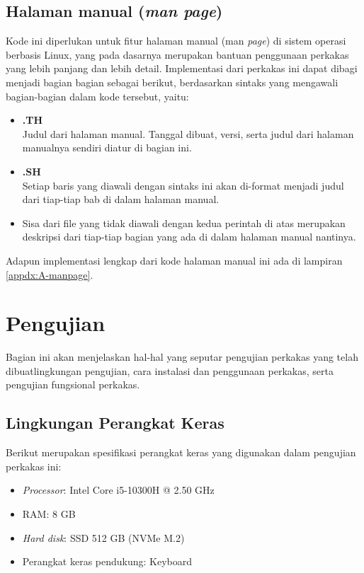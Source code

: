 \subsection{Halaman manual (\textit{man page})}
\label{sec:testing-implementation-man}

Kode ini diperlukan untuk fitur halaman manual (man \textit{page}) di sistem operasi berbasis Linux, yang pada dasarnya merupakan bantuan penggunaan perkakas yang lebih panjang dan lebih detail. Implementasi dari perkakas ini dapat dibagi menjadi bagian bagian sebagai berikut, berdasarkan sintaks yang mengawali bagian-bagian dalam kode tersebut, yaitu:

\begin{itemize}
	\item \textbf{.TH} \\
	Judul dari halaman manual. Tanggal dibuat, versi, serta judul dari halaman manualnya sendiri diatur di bagian ini.
	\item \textbf{.SH} \\
	Setiap baris yang diawali dengan sintaks ini akan di-format menjadi judul dari tiap-tiap bab di dalam halaman manual.
	\item Sisa dari file yang tidak diawali dengan kedua perintah di atas merupakan deskripsi dari tiap-tiap bagian yang ada di dalam halaman manual nantinya.
\end{itemize}
\noindent
Adapun implementasi lengkap dari kode halaman manual ini ada di lampiran \ref{appdx:A-manpage}.

\section{Pengujian}
\label{sec:testing-experiments}

Bagian ini akan menjelaskan hal-hal yang seputar pengujian perkakas yang telah dibuat\textemdash lingkungan pengujian, cara instalasi dan penggunaan perkakas, serta pengujian fungsional perkakas.

\subsection{Lingkungan Perangkat Keras}
\label{sec:testing-experiments-hardware}

Berikut merupakan spesifikasi perangkat keras yang digunakan dalam pengujian perkakas ini:

\begin{itemize}
	\item \textit{Processor}: Intel\logoregistered\xspace Core\logotrademark\xspace i5-10300H @ 2.50 GHz
	\item RAM: 8 GB
	\item \textit{Hard disk}: SSD 512 GB (NVMe\logotrademark\xspace M.2)
	\item Perangkat keras pendukung: Keyboard
\end{itemize}

